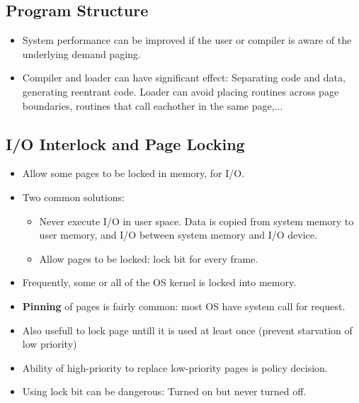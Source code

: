 \documentclass[10pt]{report}
\begin{document}
		\subsection{Program Structure}
			\begin{itemize}
				\item System performance can be improved if the user or compiler is aware of the underlying demand paging.
				\item Compiler and loader can have significant effect: Separating code and data, generating reentrant code. Loader can avoid placing routines across page boundaries, routines that call eachother in the same page,...
			\end{itemize}

		\subsection{I/O Interlock and Page Locking}
			\begin{itemize}
				\item Allow some pages to be locked in memory, for I/O.
				\item Two common solutions:
				\begin{itemize}
					\item Never execute I/O in user space. Data is copied from system memory to user memory, and I/O between system memory and I/O device.
					\item Allow pages to be locked: lock bit for every frame.
				\end{itemize}
				\item Frequently, some or all of the OS kernel is locked into memory.
				\item \textbf{Pinning} of pages is fairly common: most OS have system call for request.
				\item Also usefull to lock page untill it is used at least once (prevent starvation of low priority)
				\item Ability of high-priority to replace low-priority pages is policy decision.
				\item Using lock bit can be dangerous: Turned on but never turned off.
			\end{itemize}



\end{document}

